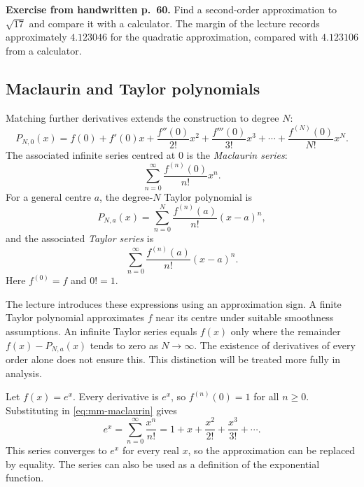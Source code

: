 \textbf{Exercise from handwritten p.~60.}
Find a second-order approximation to $\sqrt{17}$ and compare it with a
calculator. The margin of the lecture records approximately $4.123046$
for the quadratic approximation, compared with $4.123106$ from a calculator.

\subsection{Maclaurin and Taylor polynomials}
Matching further derivatives extends the construction to degree $N$:
\[
 P_{N,0}(x)=f(0)+f'(0)x+\frac{f''(0)}{2!}x^2
 +\frac{f'''(0)}{3!}x^3+\cdots+\frac{f^{(N)}(0)}{N!}x^N.
\]
The associated infinite series centred at $0$ is the \emph{Maclaurin series}:
\begin{equation}
 \sum_{n=0}^{\infty}\frac{f^{(n)}(0)}{n!}x^n.
 \tag{3}\label{eq:mm-maclaurin}
\end{equation}
For a general centre $a$, the degree-$N$ Taylor polynomial is
\[
 P_{N,a}(x)=\sum_{n=0}^N\frac{f^{(n)}(a)}{n!}(x-a)^n,
\]
and the associated \emph{Taylor series} is
\begin{equation}
 \sum_{n=0}^{\infty}\frac{f^{(n)}(a)}{n!}(x-a)^n.
 \tag{3'}\label{eq:mm-taylor}
\end{equation}
Here $f^{(0)}=f$ and $0!=1$.

\begin{remark}
The lecture introduces these expressions using an approximation sign.
A finite Taylor polynomial approximates $f$ near its centre under suitable
smoothness assumptions. An infinite Taylor series equals $f(x)$ only where
the remainder $f(x)-P_{N,a}(x)$ tends to zero as $N\to\infty$.
The existence of derivatives of every order alone does not ensure this.
This distinction will be treated more fully in analysis.
\end{remark}

\begin{example}
Let $f(x)=e^x$. Every derivative is $e^x$, so $f^{(n)}(0)=1$ for all $n\ge0$.
Substituting in \eqref{eq:mm-maclaurin} gives
\[
 e^x=\sum_{n=0}^{\infty}\frac{x^n}{n!}
 =1+x+\frac{x^2}{2!}+\frac{x^3}{3!}+\cdots.
\]
This series converges to $e^x$ for every real $x$, so the approximation can
be replaced by equality. The series can also be used as a definition of the
exponential function.
\end{example}

